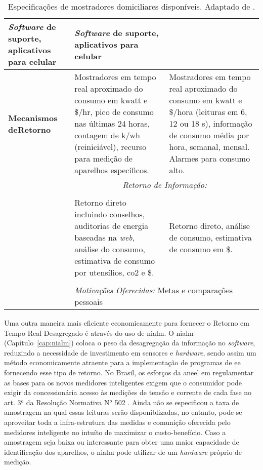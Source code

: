 \begin{table}[h!t]
{\begin{tabular}{p{4cm}p{7cm}p{7cm}}
\emph{Software} de suporte, aplicativos para celular &
\emph{Software} de suporte, aplicativos para celular \\
\hline
\textbf{Mecanismos de\newline Retorno} & 
Mostradores em tempo real aproximado do consumo em
k\acrshort{watt} e \$/hr, pico de consumo nas últimas 24 horas, contagem de
k/\acrshort{wh} (reiniciável), recurso para medição de aparelhos específicos. &
Mostradores em tempo real aproximado do consumo em k\acrshort{watt} e \$/hora
(leituras em 6, 12 ou 18 s), informação de consumo média por hora, semanal,
mensal. Alarmes para consumo alto. \\
\hline
{\multirow{5}{4cm}{\textbf{Principios Comportamentais}}} &
\multicolumn{2}{c}{\emph{Retorno de Informação:}} \\
& & \\
& 
Retorno direto incluindo conselhos, auditorias de energia baseadas na \emph{web},
análise do consumo, estimativa de consumo por utensílios, \gls{co2} e \$.  &
Retorno direto, análise de consumo, estimativa de consumo em \$.  \\
& & \\
&
\multicolumn{2}{p{14cm}}{\emph{Motivações Oferecidas:} 
\centering Metas e comparações pessoais}
\\
\hline \hline 
\end{tabular}
}
\caption[Especificações de mostradores domiciliares disponíveis.]{
Especificações de mostradores domiciliares disponíveis. Adaptado de 
\cite{aceee_2010_estudos_feedback}.}
\label{tab:servicos_ret_dir}
\end{table}


Uma outra maneira mais eficiente economicamente para fornecer o
Retorno em Tempo Real Desagregado é através do uso de \gls{nialm}. 
O \gls{nialm} (Capítulo~\ref{cap:nialm}) coloca o
peso da desagregação da informação no \emph{software}, reduzindo a necessidade
de investimento em sensores e \emph{hardware}, sendo assim um método
economicamente atraente para a implementação de programas de \gls{ee} fornecendo 
esse tipo de retorno. No Brasil, os esforços da \gls{aneel} em regulamentar as
bases para os novos medidores inteligentes exigem que o consumidor pode exigir
da concessionária acesso às medições de tensão e corrente de cada fase no art.
3$^o$ da Resolução Normativa N$^o$ 502 \cite{ren502}. Ainda não se especificou 
a taxa de amostragem na qual essas leituras serão disponiblizadas, no entanto,
pode-se aproveitar toda a infra-estrutura das medidas e comunição oferecida pelo
medidores inteligente no intuíto de maximizar o custo-benefício.  
Caso a amostragem seja baixa ou interessante para obter uma maior capacidade de
identificação dos aparelhos, o \gls{nialm} pode utilizar de um \emph{hardware} 
próprio de medição.

